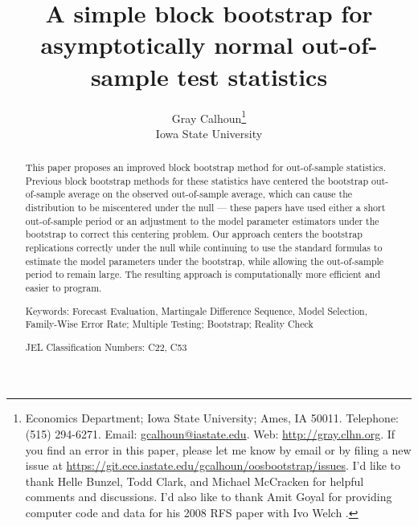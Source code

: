 \documentclass[12pt,fleqn]{article}
\begin{document}
\author{Gray Calhoun\thanks{ Economics Department; Iowa State
    University; Ames, IA 50011.  Telephone: (515) 294-6271.  Email:
    \guillemotleft\protect\url{gcalhoun@iastate.edu}\guillemotright.  Web:
    \guillemotleft\protect\url{http://gray.clhn.org}\guillemotright.
    If you find an error in this paper, please let me know by email or
    by filing a new issue at
    \guillemotleft\protect\url{https://git.ece.iastate.edu/gcalhoun/oosbootstrap/issues}\guillemotright.
    I'd like to thank Helle Bunzel, Todd Clark, and Michael McCracken
    for helpful comments and discussions.  I'd also like to thank Amit
    Goyal for providing computer code and data for his 2008
    RFS paper with Ivo
    Welch \citep{GoW:08}.} \\
  Iowa State University}

\title{A simple block bootstrap for asymptotically normal
  out-of-sample test statistics}

\maketitle

\begin{abstract} \noindent%
  This paper proposes an improved block bootstrap method for
  out-of-sample statistics. Previous block bootstrap methods for these
  statistics have centered the bootstrap out-of-sample average on the
  observed out-of-sample average, which can cause the distribution to
  be miscentered under the null --- these papers have used either a
  short out-of-sample period or an adjustment to the model parameter
  estimators under the bootstrap to correct this centering
  problem. Our approach centers the bootstrap replications correctly
  under the null while continuing to use the standard formulas to
  estimate the model parameters under the bootstrap, while allowing
  the out-of-sample period to remain large. The resulting approach is
  computationally more efficient and easier to program.

\strut

\noindent Keywords: Forecast Evaluation, Martingale Difference
Sequence, Model Selection, Family-Wise Error Rate; Multiple Testing;
Bootstrap; Reality Check

\strut

\noindent JEL Classification Numbers: C22, C53

\end{abstract}

\newpage
\end{document}

